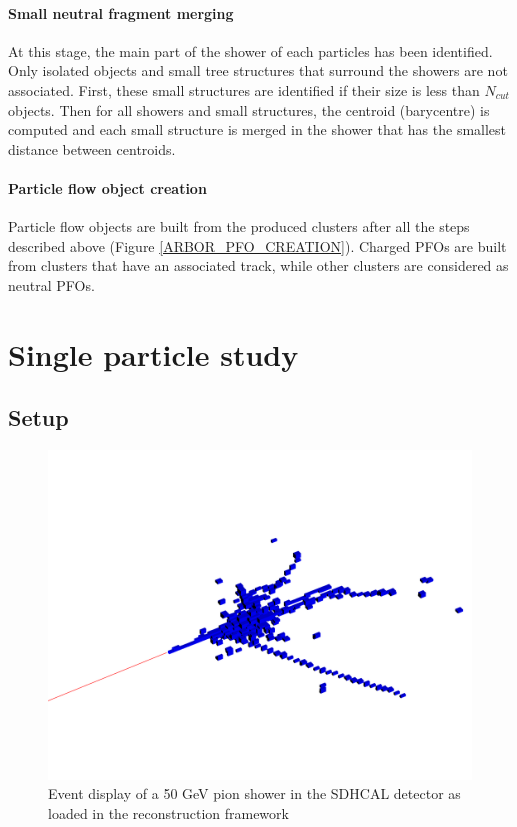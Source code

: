 \documentclass[cits]{JINST}
\begin{document}
\paragraph*{Small neutral fragment merging} At this stage, the main part of the shower of each particles has been identified. Only isolated objects and small tree structures that surround the showers are not associated. First, these small structures are identified if their size is less than $N_{cut}$ objects. Then for all showers and small structures, the centroid (barycentre) is computed and each small structure is merged in the shower that has the smallest distance between centroids.

\paragraph*{Particle flow object creation} Particle flow objects are built from the produced clusters after all the steps described above (Figure \ref{ARBOR_PFO_CREATION}). Charged PFOs are built from clusters that have an associated track, while other clusters are considered as neutral PFOs.

\newpage
\section{Single particle study}
\label{SINGLE_PARTICLE_STUDY_SECTION}

\subsection{Setup}

\begin{figure}
  \vspace{-20pt}
  \begin{center}
    \includegraphics[width=\linewidth]{SingleParticleSetup.pdf}
  \end{center}
  \vspace{-10pt}
  \caption{\label{ARBOR_SINGLE_PARTICLE_SETUP} Event display of a 50 GeV pion shower in the SDHCAL detector as loaded in the reconstruction framework}
\end{figure}
\end{document}
